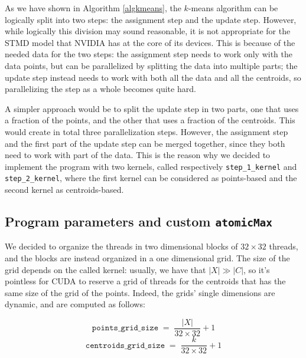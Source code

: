 \documentclass[11pt, journal]{IEEEtran}
\newcommand{\nwl}{

\vspace{11pt}

}
\begin{document}
As we have shown in Algorithm \ref{algkmeans}, the $k$-means algorithm can be logically split into two steps: the assignment step and the update step. However, while logically this division may sound reasonable, it is not appropriate for the STMD model that NVIDIA has at the core of its devices. This is because of the needed data for the two steps: the assignment step needs to work only with the data points, but can be parallelized by splitting the data into multiple parts; the update step instead needs to work with both all the data and all the centroids, so parallelizing the step as a whole becomes quite hard.
\nwl
A simpler approach would be to split the update step in two parts, one that uses a fraction of the points, and the other that uses a fraction of the centroids. This would create in total three parallelization steps. However, the assignment step and the first part of the update step can be merged together, since they both need to work with part of the data. This is the reason why we decided to implement the program with two kernels, called respectively \verb|step_1_kernel| and \verb|step_2_kernel|, where the first kernel can be considered as points-based and the second kernel as centroids-based.

\subsection{Program parameters and custom \texttt{atomicMax}}

We decided to organize the threads in two dimensional blocks of $32 \times 32$ threads, and the blocks are instead organized in a one dimensional grid. The size of the grid depends on the called kernel: usually, we have that $|X| \gg |C|$, so it's pointless for CUDA to reserve a grid of threads for the centroids that has the same size of the grid of the points. Indeed, the grids' single dimensions are dynamic, and are computed as follows:

\[ \texttt{points\_grid\_size} \; = \; \frac{\left| X \right|}{32 \times 32} + 1 \]
\[ \texttt{centroids\_grid\_size} \; = \; \frac{k}{32 \times 32} + 1 \]
\end{document}
